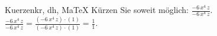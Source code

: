 \begin{MAufgabe}{Kuerzen}{kr, dh, MaTeX}
K\"urzen Sie soweit m\"oglich: $\frac{- 6\, x^4\, z}{- 6\, x^4\, z}$.\\ 
\ifLsg\MLoesung
\quad $\frac{- 6\, x^4\, z}{- 6\, x^4\, z}=\frac{(- 6\, x^4\, z)\cdot(1)}{(- 6\, x^4\, z)\cdot(1)}=\frac{1}{1}$.\else\relax\fi
 \end{MAufgabe}